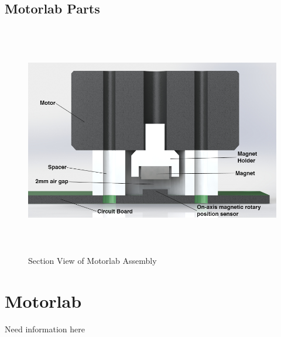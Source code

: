 \subsection{Motorlab Parts}
\label{makereference2.1.2} 

\begin{figure}[htb]%

    \includegraphics[height=4in]{figures/section_view_motorlab_assembly.png}

    \caption[Section View of Motorlab Assembly]{Section View of Motorlab Assembly}

    \label{section_view_motorlab}
\end{figure}


\section{Motorlab}
\label{makereference2.2} 

Need information here